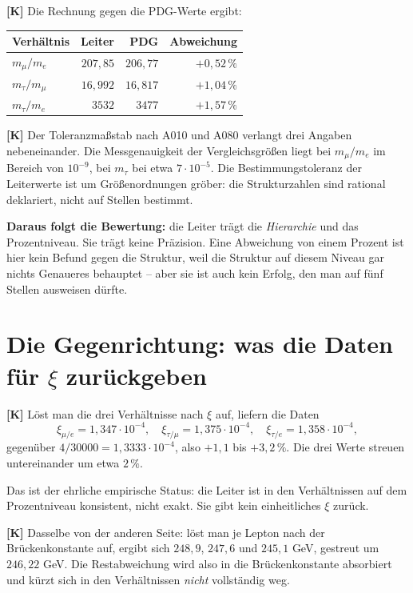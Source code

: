 \textbf{[K]} Die Rechnung gegen die PDG-Werte ergibt:

\begin{center}
\begin{tabular}{lrrr}
\hline
Verhältnis & Leiter & PDG & Abweichung \\
\hline
$m_\mu/m_e$    & $207{,}85$ & $206{,}77$ & $+0{,}52\,\%$ \\
$m_\tau/m_\mu$ & $16{,}992$ & $16{,}817$ & $+1{,}04\,\%$ \\
$m_\tau/m_e$   & $3532$     & $3477$     & $+1{,}57\,\%$ \\
\hline
\end{tabular}
\end{center}

\textbf{[K]} Der Toleranzmaßstab nach A010 und A080 verlangt drei Angaben
nebeneinander. Die Messgenauigkeit der Vergleichsgrößen liegt bei $m_\mu/m_e$
im Bereich von $10^{-9}$, bei $m_\tau$ bei etwa $7\cdot10^{-5}$. Die
Bestimmungstoleranz der Leiterwerte ist um Größenordnungen gröber: die
Strukturzahlen sind rational deklariert, nicht auf Stellen bestimmt.

\textbf{Daraus folgt die Bewertung:} die Leiter trägt die \emph{Hierarchie} und
das Prozentniveau. Sie trägt keine Präzision. Eine Abweichung von einem Prozent
ist hier kein Befund gegen die Struktur, weil die Struktur auf diesem Niveau gar
nichts Genaueres behauptet -- aber sie ist auch kein Erfolg, den man auf fünf
Stellen ausweisen dürfte.

\section{Die Gegenrichtung: was die Daten für $\xi$ zurückgeben}

\textbf{[K]} Löst man die drei Verhältnisse nach $\xi$ auf, liefern die Daten
\[
  \xi_{\mu/e} = 1{,}347\cdot10^{-4},\quad
  \xi_{\tau/\mu} = 1{,}375\cdot10^{-4},\quad
  \xi_{\tau/e} = 1{,}358\cdot10^{-4},
\]
gegenüber $4/30000 = 1{,}3333\cdot10^{-4}$, also $+1{,}1$ bis $+3{,}2\,\%$.
Die drei Werte streuen untereinander um etwa $2\,\%$.

Das ist der ehrliche empirische Status: die Leiter ist in den Verhältnissen auf
dem Prozentniveau konsistent, nicht exakt. Sie gibt kein einheitliches $\xi$
zurück.

\textbf{[K]} Dasselbe von der anderen Seite: löst man je Lepton nach der
Brückenkonstante auf, ergibt sich $248{,}9$, $247{,}6$ und $245{,}1$ GeV,
gestreut um $246{,}22$ GeV. Die Restabweichung wird also in die
Brückenkonstante absorbiert und kürzt sich in den Verhältnissen \emph{nicht}
vollständig weg.

